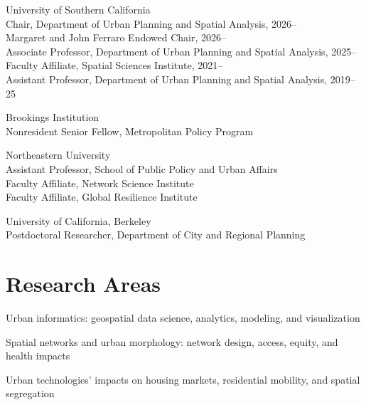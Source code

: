 \documentclass[11pt,letterpaper]{report} %
\newcommand{\listitemspace}{0.25em}
\renewenvironment{itemize}
{
  \begin{list}{}{\setlength{\leftmargin}{0em}
      \setlength{\parskip}{0em}
      \setlength{\itemsep}{\listitemspace}
  \setlength{\parsep}{\listitemspace}}}
  {
\end{list}}
\begin{document}
\begin{tablist}

\item[2019--]   \tab{}University of Southern California \\
  Chair, Department of Urban Planning and Spatial Analysis, 2026-- \\
  Margaret and John Ferraro Endowed Chair, 2026-- \\
  Associate Professor, Department of Urban Planning and Spatial Analysis, 2025-- \\
  Faculty Affiliate, Spatial Sciences Institute, 2021-- \\
  Assistant Professor, Department of Urban Planning and Spatial Analysis, 2019--25 \\

\item[2021--26] \tab{}Brookings Institution \\
  Nonresident Senior Fellow, Metropolitan Policy Program \\

\item[2018--19] \tab{}Northeastern University \\
  Assistant Professor, School of Public Policy and Urban Affairs \\
  Faculty Affiliate, Network Science Institute \\
  Faculty Affiliate, Global Resilience Institute

\item[2017--18] \tab{}University of California, Berkeley \\
  Postdoctoral Researcher, Department of City and Regional Planning

\end{tablist}

\section*{Research Areas}

\begin{itemize}

  \item Urban informatics: geospatial data science, analytics, modeling, and visualization
  \item Spatial networks and urban morphology: network design, access, equity, and health impacts
  \item Urban technologies' impacts on housing markets, residential mobility, and spatial segregation

\end{itemize}
\end{document}
